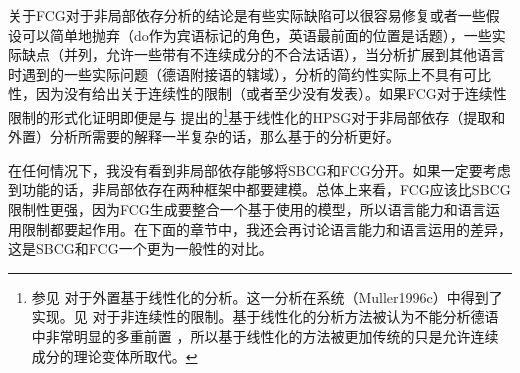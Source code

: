 关于FCG对于非局部依存分析的结论是有些实际缺陷可以很容易修复或者一些假设可以简单地抛弃（do作为宾语标记的角色，英语最前面的位置是话题），一些实际缺点（并列，允许一些带有不连续成分的不合法话语），当分析扩展到其他语言时遇到的一些实际问题（德语附接语的辖域），分析的简约性实际上不具有可比性，因为没有给出关于连续性的限制（或者至少没有发表）。如果FCG对于连续性限制的形式化证明即便是与 \citet{Reape2000a}提出的\footnote{%
  参见 对于外置基于线性化的分析。这一分析在\citep{Babel}系统（Muller1996c）中得到了实现。见\citep{Mueller99g} 对于非连续性的限制。基于线性化的分析方法被认为不能分析德语中非常明显的多重前置\citep{Mueller2005d,MuellerGS} ，所以基于线性化的方法被更加传统的只是允许连续成分的理论变体所取代。
}基于线性化的HPSG对于非局部依存（提取和外置）分析所需要的解释一半复杂的话，那么基于\slaschc 的分析更好。

在任何情况下，我没有看到非局部依存能够将SBCG和FCG分开。如果一定要考虑到功能的话，非局部依存在两种框架中都要建模。总体上来看，FCG应该比SBCG限制性更强，因为FCG生成要整合一个基于使用的模型，所以语言能力和语言运用限制都要起作用。在下面的章节中，我还会再讨论语言能力和语言运用的差异，这是SBCG和FCG一个更为一般性的对比。

